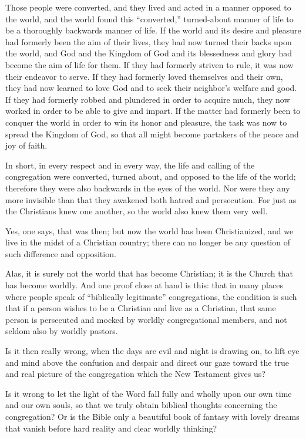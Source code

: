 Those people were converted, and they lived and acted in a manner opposed to the world, and the world found this “converted,” turned-about manner of life to be a thoroughly backwards manner of life. If the world and its desire and pleasure had formerly been the aim of their lives, they had now turned their backs upon the world, and God and the Kingdom of God and its blessedness and glory had become the aim of life for them. If they had formerly striven to rule, it was now their endeavor to serve. If they had formerly loved themselves and their own, they had now learned to love God and to seek their neighbor’s welfare and good. If they had formerly robbed and plundered in order to acquire much, they now worked in order to be able to give and impart. If the matter had formerly been to conquer the world in order to win its honor and pleasure, the task was now to spread the Kingdom of God, so that all might become partakers of the peace and joy of faith.

In short, in every respect and in every way, the life and calling of the congregation were converted, turned about, and opposed to the life of the world; therefore they were also backwards in the eyes of the world. Nor were they any more invisible than that they awakened both hatred and persecution. For just as the Christians knew one another, so the world also knew them very well.

Yes, one says, that was then; but now the world has been Christianized, and we live in the midst of a Christian country; there can no longer be any question of such difference and opposition.

Alas, it is surely not the world that has become Christian; it is the Church that has become worldly. And one proof close at hand is this: that in many places where people speak of “biblically legitimate” congregations, the condition is such that if a person wishes to be a Christian and live as a Christian, that same person is persecuted and mocked by worldly congregational members, and not seldom also by worldly pastors.

Is it then really wrong, when the days are evil and night is drawing on, to lift eye and mind above the confusion and despair and direct our gaze toward the true and real picture of the congregation which the New Testament gives us?

Is it wrong to let the light of the Word fall fully and wholly upon our own time and our own souls, so that we truly obtain biblical thoughts concerning the congregation? Or is the Bible only a beautiful book of fantasy with lovely dreams that vanish before hard reality and clear worldly thinking?

